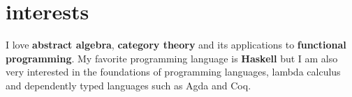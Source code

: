 \documentclass[]{friggeri-cv-a4}
\begin{document}
\section{interests}
I love \textbf{abstract algebra}, \textbf{category theory} and its applications to \textbf{functional
programming}. My favorite programming language is \textbf{Haskell} but I am also very interested in
the foundations of programming languages, lambda calculus and dependently typed languages such
as Agda and Coq.
\end{document}
